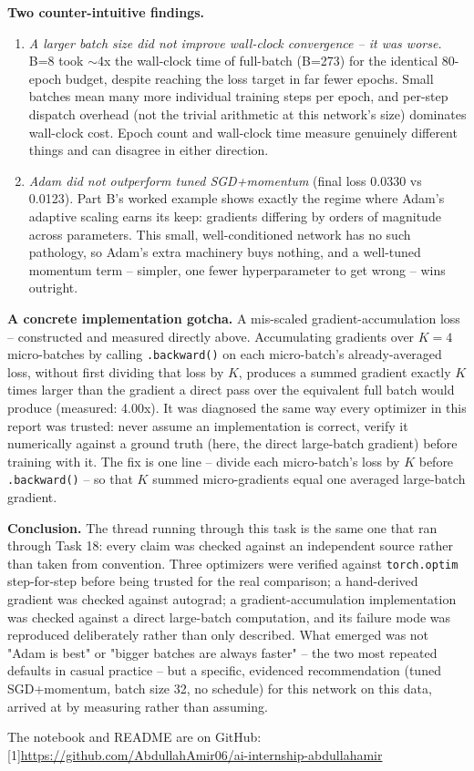 \documentclass[11pt,a4paper]{article}
\begin{document}
\textbf{Two counter-intuitive findings.}
\begin{enumerate}
    \item \emph{A larger batch size did not improve wall-clock convergence -- it was
    worse.} B=8 took $\sim$4x the wall-clock time of full-batch (B=273) for the
    identical 80-epoch budget, despite reaching the loss target in far fewer epochs.
    Small batches mean many more individual training steps per epoch, and per-step
    dispatch overhead (not the trivial arithmetic at this network's size) dominates
    wall-clock cost. Epoch count and wall-clock time measure genuinely different things
    and can disagree in either direction.
    \item \emph{Adam did not outperform tuned SGD+momentum} (final loss 0.0330 vs
    0.0123). Part B's worked example shows exactly the regime where Adam's adaptive
    scaling earns its keep: gradients differing by orders of magnitude across
    parameters. This small, well-conditioned network has no such pathology, so Adam's
    extra machinery buys nothing, and a well-tuned momentum term -- simpler, one fewer
    hyperparameter to get wrong -- wins outright.
\end{enumerate}

\textbf{A concrete implementation gotcha.} A mis-scaled gradient-accumulation loss --
constructed and measured directly above. Accumulating gradients over $K=4$ micro-batches
by calling \texttt{.backward()} on each micro-batch's already-averaged loss, without
first dividing that loss by $K$, produces a summed gradient exactly $K$ times larger
than the gradient a direct pass over the equivalent full batch would produce (measured:
4.00x). It was diagnosed the same way every optimizer in this report was trusted: never
assume an implementation is correct, verify it numerically against a ground truth (here,
the direct large-batch gradient) before training with it. The fix is one line -- divide
each micro-batch's loss by $K$ before \texttt{.backward()} -- so that $K$ summed
micro-gradients equal one averaged large-batch gradient.

\textbf{Conclusion.} The thread running through this task is the same one that ran
through Task 18: every claim was checked against an independent source rather than
taken from convention. Three optimizers were verified against \texttt{torch.optim}
step-for-step before being trusted for the real comparison; a hand-derived gradient was
checked against autograd; a gradient-accumulation implementation was checked against a
direct large-batch computation, and its failure mode was reproduced deliberately rather
than only described. What emerged was not "Adam is best" or "bigger batches are always
faster" -- the two most repeated defaults in casual practice -- but a specific,
evidenced recommendation (tuned SGD+momentum, batch size 32, no schedule) for this
network on this data, arrived at by measuring rather than assuming.

\vspace{0.4cm}
\noindent The notebook and README are on GitHub: {\small\scalebox{0.72}[1]{\url{https://github.com/AbdullahAmir06/ai-internship-abdullahamir}}}
\end{document}

